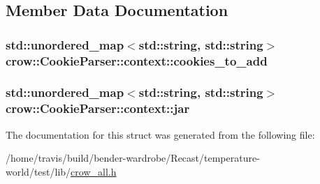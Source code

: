\subsection{Member Data Documentation}
\hypertarget{structcrow_1_1_cookie_parser_1_1context_a4ceb4f28367b1a38ed1decc355d701eb}{
\subsubsection[{cookies\-\_\-to\-\_\-add}]{\setlength{\rightskip}{0pt plus 5cm}std\-::unordered\-\_\-map$<$std\-::string, std\-::string$>$ crow\-::\-Cookie\-Parser\-::context\-::cookies\-\_\-to\-\_\-add}}\label{structcrow_1_1_cookie_parser_1_1context_a4ceb4f28367b1a38ed1decc355d701eb}
\hypertarget{structcrow_1_1_cookie_parser_1_1context_a65674550c5ee9ade652a4785c6b9b30c}{
\subsubsection[{jar}]{\setlength{\rightskip}{0pt plus 5cm}std\-::unordered\-\_\-map$<$std\-::string, std\-::string$>$ crow\-::\-Cookie\-Parser\-::context\-::jar}}\label{structcrow_1_1_cookie_parser_1_1context_a65674550c5ee9ade652a4785c6b9b30c}


The documentation for this struct was generated from the following file\-:\begin{DoxyCompactItemize}
\item 
/home/travis/build/bender-\/wardrobe/\-Recast/temperature-\/world/test/lib/\hyperlink{crow__all_8h}{crow\-\_\-all.\-h}\end{DoxyCompactItemize}
